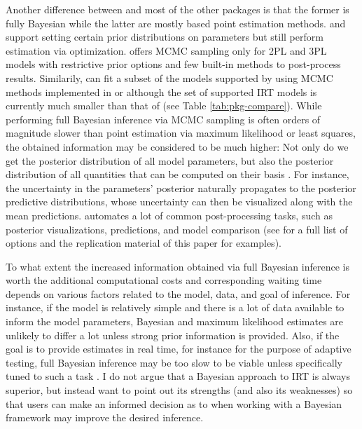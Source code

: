 \documentclass[jss]{jss}
\begin{document}
Another difference between  and most of the other packages is
that the former is fully Bayesian while the latter are mostly based
point estimation methods.  and  support setting
certain prior distributions on parameters but still perform estimation
via optimization.  offers MCMC sampling only for 2PL and 3PL
models with restrictive prior options and few built-in methods to
post-process results. Similarily,  can fit a subset of the
models supported by  using MCMC methods implemented in
 \citep{jags} or  \citep{carpenter2017}
although the set of supported IRT models is currently much smaller than
that of  (see Table \ref{tab:pkg-compare}). While performing
full Bayesian inference via MCMC sampling is often orders of magnitude
slower than point estimation via maximum likelihood or least squares,
the obtained information may be considered to be much higher: Not only
do we get the posterior distribution of all model parameters, but also
the posterior distribution of all quantities that can be computed on
their basis \citep{gelman2013}. For instance, the uncertainty in the
parameters' posterior naturally propagates to the posterior predictive
distributions, whose uncertainty can then be visualized along with the
mean predictions.  automates a lot of common post-processing
tasks, such as posterior visualizations, predictions, and model
comparison (see  for a full list of
options and the replication material of this paper for examples).

To what extent the increased information obtained via full Bayesian
inference is worth the additional computational costs and corresponding
waiting time depends on various factors related to the model, data, and
goal of inference. For instance, if the model is relatively simple and
there is a lot of data available to inform the model parameters,
Bayesian and maximum likelihood estimates are unlikely to differ a lot
unless strong prior information is provided. Also, if the goal is to
provide estimates in real time, for instance for the purpose of adaptive
testing, full Bayesian inference may be too slow to be viable unless
specifically tuned to such a task \citep[e.g., see][]{vanderlinen2015}.
I do not argue that a Bayesian approach to IRT is always superior, but
instead want to point out its strengths (and also its weaknesses) so
that users can make an informed decision as to when working with a
Bayesian framework may improve the desired inference.
\end{document}
